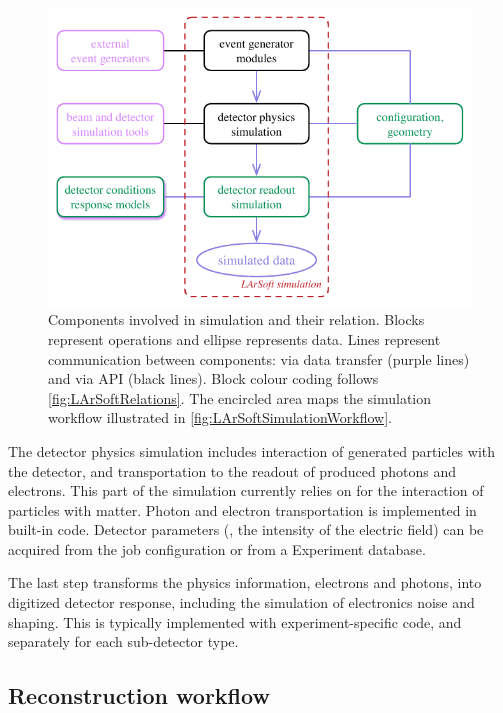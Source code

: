 \begin{figure}
   \centering
   \includegraphics{figures/LArSoftSimulationComponents}
   \caption{\label{fig:LArSoftSimulationRelations}
      Components involved in simulation and their relation.
      Blocks represent operations and ellipse represents data.
      Lines represent communication between components: via data transfer (purple lines) and via API (black lines). 
      Block colour coding follows \cref{fig:LArSoftRelations}.
      The encircled area maps the simulation workflow illustrated in \cref{fig:LArSoftSimulationWorkflow}.
   }
\end{figure}
The detector physics simulation includes interaction of 
generated particles with the detector,
and transportation to the readout of produced photons and electrons.
This part of the simulation currently relies on \GEANT for the interaction of particles with matter.
Photon and electron transportation is implemented in built-in code.
Detector parameters (\eg, the intensity of the electric field)
can be acquired from the job configuration or from a Experiment database.

The last step transforms the physics information, electrons and photons,
into digitized detector response,
including the simulation of electronics noise and shaping.
This is typically implemented with experiment-specific code,
and separately for each sub-detector type.


\subsection{Reconstruction workflow}
\label{ssec:Workflows:Reconstruction}

